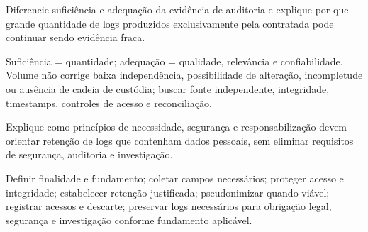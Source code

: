 \begin{discursiva}
Diferencie suficiência e adequação da evidência de auditoria e explique por que grande quantidade de logs produzidos exclusivamente pela contratada pode continuar sendo evidência fraca.
\end{discursiva}
\begin{resumo}[Espelho Q5]Suficiência = quantidade; adequação = qualidade, relevância e confiabilidade. Volume não corrige baixa independência, possibilidade de alteração, incompletude ou ausência de cadeia de custódia; buscar fonte independente, integridade, timestamps, controles de acesso e reconciliação.\end{resumo}

\begin{discursiva}
Explique como princípios de necessidade, segurança e responsabilização devem orientar retenção de logs que contenham dados pessoais, sem eliminar requisitos de segurança, auditoria e investigação.
\end{discursiva}
\begin{resumo}[Espelho Q6]Definir finalidade e fundamento; coletar campos necessários; proteger acesso e integridade; estabelecer retenção justificada; pseudonimizar quando viável; registrar acessos e descarte; preservar logs necessários para obrigação legal, segurança e investigação conforme fundamento aplicável.\end{resumo}
